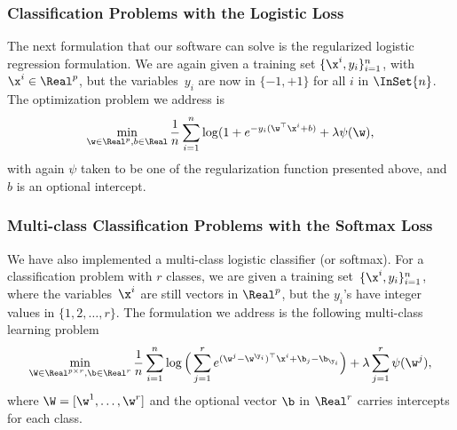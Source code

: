 \documentclass[a4paper, 11pt]{article}
\begin{document}
   \subsubsection{Classification Problems with the Logistic Loss}
   The next formulation that our software can solve is the regularized logistic regression formulation.
   We are again given a training set $\{\x^i,y_i\}_{i=1}^n$, with $\x^i \in
   \Real^p$, but the variables~$y_i$ are now in $\{-1,+1\}$ for all $i$ in
   $\InSet{n}$. The optimization problem we address is
   \begin{displaymath}
   \min_{\w \in \Real^p, b \in \Real} \frac{1}{n}\sum_{i=1}^n \log(1+e^{-y_i(\w^\top\x^i+b)} + \lambda\psi(\w),
         \end{displaymath}
         with again $\psi$ taken to be one of the regularization function presented above, and $b$ is an optional intercept.
         \subsubsection{Multi-class Classification Problems with the Softmax Loss}
         We have also implemented a multi-class logistic classifier (or softmax).
         For a classification problem with $r$ classes, we are given a training set~$\{\x^i,y_i\}_{i=1}^n$, where the variables~$\x^i$ are still vectors in $\Real^p$, but the $y_i$'s have integer values in $\{1,2,\ldots,r\}$. The formulation we address is the following multi-class learning problem
         \begin{equation}
         \min_{\W \in \Real^{p \times r}, \b \in \Real^r} \frac{1}{n}\sum_{i=1}^n \log\Big(\sum_{j=1}^r e^{ (\w^j-\w^{\y_i})^\top\x^i + \b_j-\b_{\y_i}}\Big) + \lambda\sum_{j=1}^r\psi(\w^j),\label{software:eq:class}
         \end{equation}
         where $\W = [\w^1,\ldots,\w^r]$ and the optional vector $\b$ in $\Real^r$ carries intercepts for each class.
\end{document}
